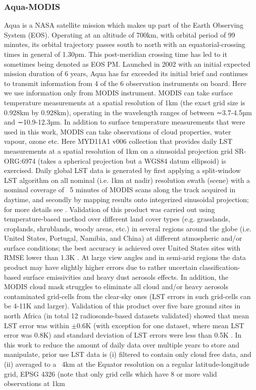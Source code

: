 \documentclass[hess, twostagejnl]{copernicus}
\begin{document}
\subsubsection{Aqua-MODIS}


\noindent Aqua  \citep{aquaref} is a NASA satellite mission which makes up part of the Earth Observing System (EOS). Operating at an altitude of 700km, with orbital period of 99 minutes, its orbital trajectory passes south to north with an equatorial-crossing times in general of 1.30pm. This post-meridian crossing time has led to it sometimes being denoted as EOS PM. Launched in 2002 with an initial expected mission duration of 6 years, Aqua has far exceeded its initial brief and continues to transmit information from 4 of the 6 observation instruments on board. Here we use information only from MODIS instrument. MODIS can take surface temperature measurements at a spatial resolution of 1km (the exact grid size is 0.928km by 0.928km), operating in the wavelength ranges of between ∼3.7-4.5µm and ∼10.9-12.3µm. In addition to surface temperature measurements that were used in this work, MODIS can take observations of cloud properties, water vapour, ozone etc. Here MYD11A1 v006 \citep{MODISusersguide} collection that provides daily LST measurements at a spatial resolution of 1km on a sinusoidal projection grid SR-ORG:6974 (takes a spherical projection but a WGS84 datum ellipsoid) is exercised. Daily global LST data is generated by first applying a split-window LST algorithm \citep{508406} on all nominal (i.e. 1km at nadir) resolution swath (scene) with a nominal coverage of ~5 minutes of MODIS scans along the track acquired in daytime, and secondly by mapping results onto integerized sinusoidal projection; for more details see \citep{MODISusersguide}. Validation of this product was carried out using temperature-based method over different land cover types (e.g. grasslands, croplands, shrublands, woody areas, etc.) in several regions around the globe (i.e. United States, Portugal, Namibia, and China) at different atmospheric and/or surface conditions; the best accuracy is achieved over United States sites with RMSE lower than 1.3K \citep{DUAN201916}. At large view angles and in semi-arid regions the data product may have slightly higher errors due to rather uncertain classification-based surface emissivities and heavy dust aerosols effects. In addition, the MODIS cloud mask struggles to eliminate all cloud and/or heavy aerosols contaminated grid-cells from the clear-sky ones (LST errors in such grid-cells can be 4-11K and larger). Validation of this product over five bare ground sites in north Africa (in total 12 radiosonde-based datasets validated) showed that mean LST error was within $\pm$0.6K (with exception for one dataset, where mean LST error was 0.8K) and standard deviation of LST errors were less than 0.5K \cite{DUAN201916}. In this work to reduce the amount of daily data over multiple years to store and manipulate, prior use LST data is (i) filtered to contain only cloud free data, and (ii) averaged to a ~4km at the Equator resolution on a regular latitude-longitude grid, EPSG 4326 (note that only grid cells which have 8 or more valid observations at 1km 
\end{document}
